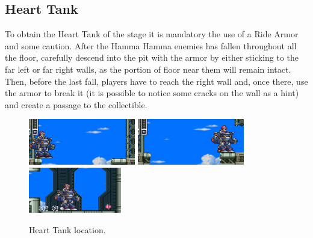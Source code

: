 \subsection{Heart Tank}
To obtain the Heart Tank of the stage it is mandatory the use of a Ride Armor and some caution. After the Hamma Hamma enemies has fallen throughout all the floor, carefully descend into the pit with the armor by either sticking to the far left or far right walls, as the portion of floor near them will remain intact. Then,  before the last fall, players have to reach the right wall and, once there, use the armor to break it (it is possible to notice some cracks on the wall as a hint) and create a passage to the collectible.
\begin{figure}[htp]
	\centering
	\includegraphics[height=2cm]{figures/X3/Crush_crawfish/heart_1.jpg}
	\includegraphics[height=2cm]{figures/X3/Crush_crawfish/heart_2.jpg}\vspace{2pt}\\
	\includegraphics[height=2cm]{figures/X3/Crush_crawfish/heart_3.jpg}
	\caption{Heart Tank location.}
\end{figure}

